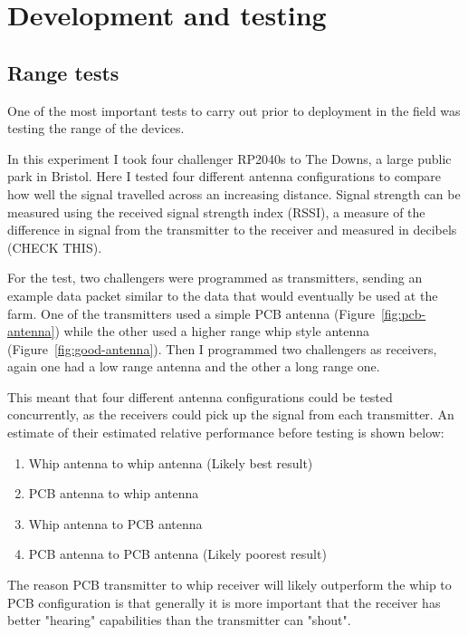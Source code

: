 \section{Development and testing}

\subsection{Range tests}

One of the most important tests to carry out prior to deployment in the field
was testing the range of the devices.

In this experiment I took four challenger RP2040s to The Downs, a large public
park in Bristol. Here I tested four different antenna configurations to compare
how well the signal travelled across an increasing distance. Signal strength can
be measured using the received signal strength index (RSSI), a measure of the
difference in signal from the transmitter to the receiver and measured in
decibels (CHECK THIS).

For the test, two challengers were programmed as transmitters, sending an
example data packet similar to the data that would eventually be used at the
farm. One of the transmitters used a simple PCB antenna
(Figure~\ref{fig:pcb-antenna}) while the other used a higher range whip style
antenna (Figure~\ref{fig:good-antenna}). Then I programmed two challengers as
receivers, again one had a low range antenna and the other a long range one.

This meant that four different antenna configurations could be tested
concurrently, as the receivers could pick up the signal from each transmitter.
An estimate of their estimated relative performance before testing is shown
below:

\begin{enumerate}
    \item Whip antenna to whip antenna (Likely best result)
    \item PCB antenna to whip antenna
    \item Whip antenna to PCB antenna
    \item PCB antenna to PCB antenna (Likely poorest result)
\end{enumerate}

The reason PCB transmitter to whip receiver will likely outperform the whip to
PCB configuration is that generally it is more important that the receiver has
better "hearing" capabilities than the transmitter can "shout".

